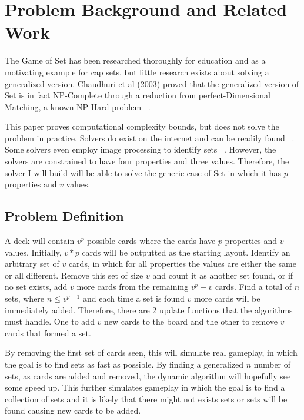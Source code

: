\documentclass[pageno]{jpaper}
\begin{document}
\section{Problem Background and Related Work}


The Game of Set has been researched thoroughly for education and as a motivating example for cap sets, but little research exists about solving a generalized version. Chaudhuri et al (2003) proved that the generalized version of Set is in fact NP-Complete through a reduction from perfect-Dimensional Matching, a known NP-Hard problem ~\cite{chaudhuri}.  

This paper proves computational complexity bounds, but does not solve the problem in practice. Solvers do exist on the internet and can be readily found ~\cite{nolte}. Some solvers even employ image processing to identify sets ~\cite{jorquera}. However, the solvers are constrained to have four properties and three values. Therefore, the solver I will build will be able to solve the generic case of Set in which it has $p$ properties and $v$ values.  

\subsection{Problem Definition}

A deck will contain $v^p$ possible cards where the cards have $p$ properties and $v$ values. Initially, $v*p$ cards will be outputted as the starting layout. Identify an arbitrary set of $v$ cards, in which for all properties the values are either the same or all different. Remove this set of size $v$ and count it as another set found, or if no set exists, add $v$ more cards from the remaining $v^p - v$ cards. Find a total of $n$ sets, where $n \leq v^{p-1}$ and each time a set is found $v$ more cards will be immediately added. Therefore, there are 2 update functions that the algorithms must handle. One to add $v$ new cards to the board and the other to remove $v$ cards that formed a set. 

By removing the first set of cards seen, this will simulate real gameplay, in which the goal is to find sets as fast as possible. By finding a generalized $n$ number of sets, as cards are added and removed, the dynamic algorithm will hopefully see some speed up. This further simulates gameplay in which the goal is to find a collection of sets and it is likely that there might not exists sets or sets will be found causing new cards to be added. 
\end{document}

